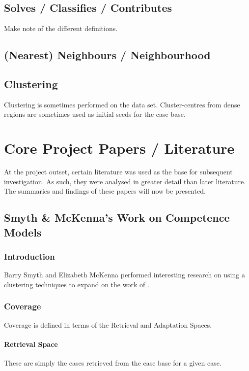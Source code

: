 \documentclass[a4paper,11pt]{report}
\begin{document}
\subsection{Solves / Classifies / Contributes}
Make note of the different definitions.

\subsection{(Nearest) Neighbours / Neighbourhood}

\subsection{Clustering}
Clustering is sometimes performed on the data set. Cluster-centres from dense regions are sometimes used as initial seeds for the case base.

\section{Core Project Papers / Literature}
At the project outset, certain literature was used as the base for subsequent investigation. As such, they were analysed in greater detail than later literature. The summaries and findings of these papers will now be presented.

\subsection{Smyth \& McKenna's Work on Competence Models}
\subsubsection{Introduction}
Barry Smyth and Elizabeth McKenna performed interesting research on using a clustering techniques to expand on the work of \citet{Smyth1995} \cite{Smyth1998}.

\subsubsection{Coverage}
Coverage is defined in terms of the Retrieval and Adaptation Spaces.

\paragraph{Retrieval Space}

These are simply the cases retrieved from the case base for a given case.
\end{document}
